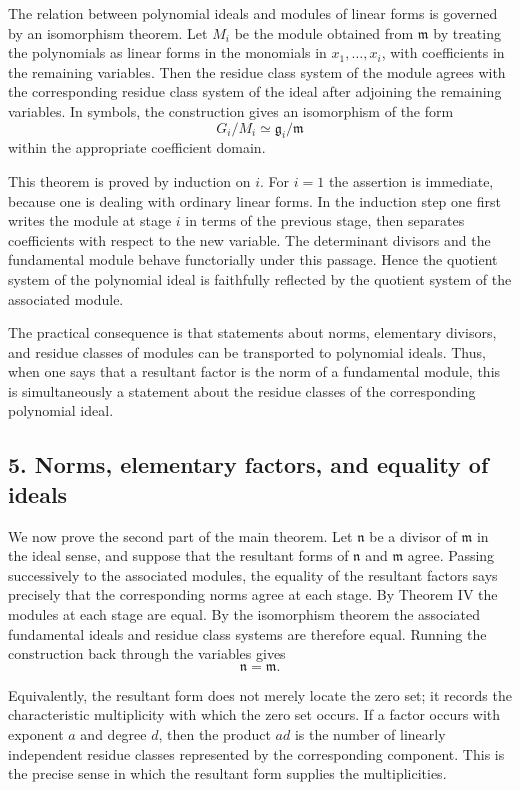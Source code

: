 \documentclass[12pt]{article}
\begin{document}
The relation between polynomial ideals and modules of linear forms is governed by an isomorphism theorem. Let $M_i$ be the module obtained from $\mathfrak m$ by treating the polynomials as linear forms in the monomials in $x_1,
\ldots,x_i$, with coefficients in the remaining variables. Then the residue class system of the module agrees with the corresponding residue class system of the ideal after adjoining the remaining variables. In symbols, the construction gives an isomorphism of the form
\[
  G_i/M_i \simeq \mathfrak g_i/\mathfrak m
\]
within the appropriate coefficient domain.

This theorem is proved by induction on $i$. For $i=1$ the assertion is immediate, because one is dealing with ordinary linear forms. In the induction step one first writes the module at stage $i$ in terms of the previous stage, then separates coefficients with respect to the new variable. The determinant divisors and the fundamental module behave functorially under this passage. Hence the quotient system of the polynomial ideal is faithfully reflected by the quotient system of the associated module.

The practical consequence is that statements about norms, elementary divisors, and residue classes of modules can be transported to polynomial ideals. Thus, when one says that a resultant factor is the norm of a fundamental module, this is simultaneously a statement about the residue classes of the corresponding polynomial ideal.

\subsection{5. Norms, elementary factors, and equality of ideals}

We now prove the second part of the main theorem. Let $\mathfrak n$ be a divisor of $\mathfrak m$ in the ideal sense, and suppose that the resultant forms of $\mathfrak n$ and $\mathfrak m$ agree. Passing successively to the associated modules, the equality of the resultant factors says precisely that the corresponding norms agree at each stage. By Theorem IV the modules at each stage are equal. By the isomorphism theorem the associated fundamental ideals and residue class systems are therefore equal. Running the construction back through the variables gives
\[
  \mathfrak n=\mathfrak m.
\]

Equivalently, the resultant form does not merely locate the zero set; it records the characteristic multiplicity with which the zero set occurs. If a factor occurs with exponent $a$ and degree $d$, then the product $ad$ is the number of linearly independent residue classes represented by the corresponding component. This is the precise sense in which the resultant form supplies the multiplicities.
\end{document}
